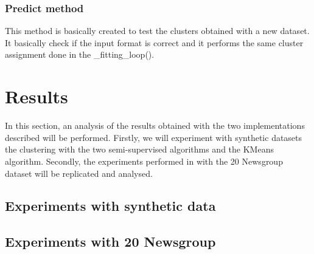 \documentclass[11pt]{article}
\begin{document}


\subsubsection{Predict method}

This method is basically created to test the clusters obtained with a new dataset. It basically check if the input format is correct and it performs the same cluster assignment done in the \_fitting\_loop(). 

\section{Results}

In this section, an analysis of the results obtained with the two implementations described will be performed. Firstly, we will experiment with synthetic datasets the clustering with the two semi-supervised algorithms and the KMeans algorithm. Secondly, the experiments performed in \cite{Basu:2002:SCS:645531.656012} with the 20 Newsgroup dataset will be replicated and analysed. 

\subsection{Experiments with synthetic data}

\subsection{Experiments with 20 Newsgroup}

\newpage
\nocite{*}
\printbibliography


\end{document}
